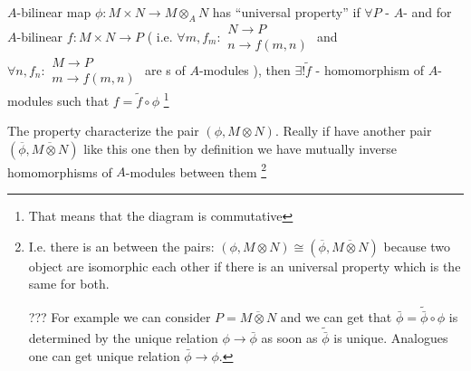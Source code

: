 \begin{definition}
  $A$-bilinear map $\phi: M \times N \to M \otimes_A N$ has
  ``universal property'' if
  $\forall P$ - $A$- and
  for $A$-bilinear $f: M \times N \to P$ (
  i.e.
  \(
  \forall m, f_m:
  \begin{array}{c}
    N \to P \\
    n \to f(m,n)
    \end{array}
  \)
  and
  \(
  \forall n, f_n:
  \begin{array}{c}
    M \to P \\
    m \to f(m,n)
    \end{array}
  \)
  are s of $A$-modules
  ), then
  $\exists! \tilde{f}$ - homomorphism of $A$-modules such that
  $f = \tilde{f} \circ \phi$
  \footnote{
    That means that the diagram is commutative
  }

  \label{def:universalproperty}
\end{definition}

The property characterize the pair
$\left(\phi, M \otimes N\right)$.
Really if have another pair
$\left(\overline{\phi}, \overline{M \otimes N}\right)$
like this one then by definition we have mutually inverse
homomorphisms of $A$-modules between them
\footnote{
  I.e. there is an  between the pairs:
  $\left(\phi, M \otimes N\right) \cong \left(\overline{\phi},
  \overline{M \otimes N}\right)$ because two object are isomorphic
  each other if there is an universal property which is the same for
  both.

  ??? For example we can consider $P = \overline{M \otimes N}$ and we
  can get that $\bar{\phi} = \tilde{\bar{\phi}} \circ \phi$ is
  determined by the unique
  relation $\phi \to \bar{\phi}$ as soon as
  $\tilde{\bar{\phi}}$ is unique. Analogues one can get unique relation
  $\bar{\phi} \to \phi$.
}

